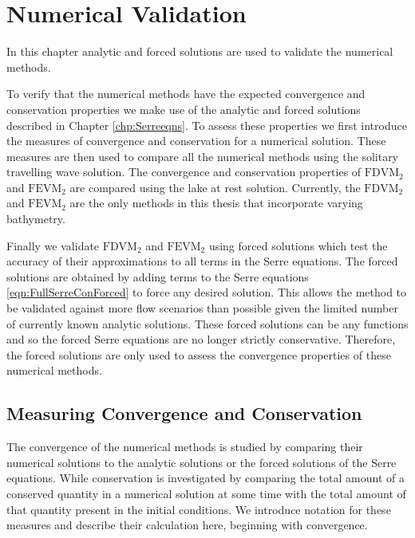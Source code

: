 
\chapter{Numerical Validation}
\label{chp:NumMethodComp}
In this chapter analytic and forced solutions are used to validate the numerical methods. 


To verify that the numerical methods have the expected convergence and conservation properties we make use of the analytic and forced solutions described in Chapter \ref{chp:Serreeqns}. To assess these properties we first introduce the measures of convergence and conservation for a numerical solution. These measures are then used to compare all the numerical methods using the solitary travelling wave solution. The convergence and conservation properties of $\text{FDVM}_2$ and $\text{FEVM}_2$ are compared using the lake at rest solution. Currently, the $\text{FDVM}_2$ and $\text{FEVM}_2$ are the only methods in this thesis that incorporate varying bathymetry.

Finally we validate $\text{FDVM}_2$ and $\text{FEVM}_2$ using forced solutions which test the accuracy of their approximations to all terms in the Serre equations. The forced solutions are obtained by adding terms to the Serre equations \eqref{eqn:FullSerreConForced} to force any desired solution. This allows the method to be validated against more flow scenarios than possible given the limited number of currently known analytic solutions. These forced solutions can be any functions and so the forced Serre equations are no longer strictly conservative. Therefore, the forced solutions are only used to assess the convergence properties of these numerical methods. 

\section{Measuring Convergence and Conservation}
The convergence of the numerical methods is studied by comparing their numerical solutions to the analytic solutions or the forced solutions of the Serre equations. While conservation is investigated by comparing the total amount of a conserved quantity in a numerical solution at some time with the total amount of that quantity present in the initial conditions. We introduce notation for these measures and describe their calculation here, beginning with convergence.

